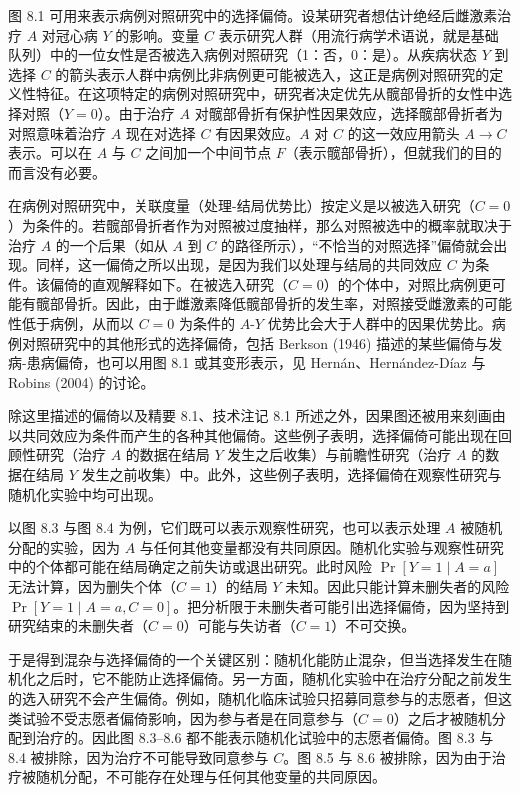 \begin{finepoint}[病例对照研究中的选择偏倚]
图 8.1 可用来表示病例对照研究中的选择偏倚。设某研究者想估计绝经后雌激素治疗 $A$ 对冠心病 $Y$ 的影响。变量 $C$ 表示研究人群（用流行病学术语说，就是基础队列）中的一位女性是否被选入病例对照研究（1：否，0：是）。从疾病状态 $Y$ 到选择 $C$ 的箭头表示人群中病例比非病例更可能被选入，这正是病例对照研究的定义性特征。在这项特定的病例对照研究中，研究者决定优先从髋部骨折的女性中选择对照（$Y=0$）。由于治疗 $A$ 对髋部骨折有保护性因果效应，选择髋部骨折者为对照意味着治疗 $A$ 现在对选择 $C$ 有因果效应。$A$ 对 $C$ 的这一效应用箭头 $A\to C$ 表示。可以在 $A$ 与 $C$ 之间加一个中间节点 $F$（表示髋部骨折），但就我们的目的而言没有必要。

在病例对照研究中，关联度量（处理-结局优势比）按定义是以被选入研究（$C=0$）为条件的。若髋部骨折者作为对照被过度抽样，那么对照被选中的概率就取决于治疗 $A$ 的一个后果（如从 $A$ 到 $C$ 的路径所示），“不恰当的对照选择”偏倚就会出现。同样，这一偏倚之所以出现，是因为我们以处理与结局的共同效应 $C$ 为条件。该偏倚的直观解释如下。在被选入研究（$C=0$）的个体中，对照比病例更可能有髋部骨折。因此，由于雌激素降低髋部骨折的发生率，对照接受雌激素的可能性低于病例，从而以 $C=0$ 为条件的 $A$-$Y$ 优势比会大于人群中的因果优势比。病例对照研究中的其他形式的选择偏倚，包括 Berkson (1946) 描述的某些偏倚与发病-患病偏倚，也可以用图 8.1 或其变形表示，见 Hernán、Hernández-Díaz 与 Robins (2004) 的讨论。
\end{finepoint}

除这里描述的偏倚以及精要 8.1、技术注记 8.1 所述之外，因果图还被用来刻画由以共同效应为条件而产生的各种其他偏倚。这些例子表明，选择偏倚可能出现在回顾性研究（治疗 $A$ 的数据在结局 $Y$ 发生之后收集）与前瞻性研究（治疗 $A$ 的数据在结局 $Y$ 发生之前收集）中。此外，这些例子表明，选择偏倚在观察性研究与随机化实验中均可出现。

以图 8.3 与图 8.4 为例，它们既可以表示观察性研究，也可以表示处理 $A$ 被随机分配的实验，因为 $A$ 与任何其他变量都没有共同原因。随机化实验与观察性研究中的个体都可能在结局确定之前失访或退出研究。此时风险 $\Pr[Y=1\mid A=a]$ 无法计算，因为删失个体（$C=1$）的结局 $Y$ 未知。因此只能计算未删失者的风险 $\Pr[Y=1\mid A=a,C=0]$。把分析限于未删失者可能引出选择偏倚，因为坚持到研究结束的未删失者（$C=0$）可能与失访者（$C=1$）不可交换。

于是得到混杂与选择偏倚的一个关键区别：随机化能防止混杂，但当选择发生在随机化之后时，它不能防止选择偏倚。另一方面，随机化实验中在治疗分配之前发生的选入研究不会产生偏倚。例如，随机化临床试验只招募同意参与的志愿者，但这类试验不受志愿者偏倚影响，因为参与者是在同意参与（$C=0$）之后才被随机分配到治疗的。因此图 8.3–8.6 都不能表示随机化试验中的志愿者偏倚。图 8.3 与 8.4 被排除，因为治疗不可能导致同意参与 $C$。图 8.5 与 8.6 被排除，因为由于治疗被随机分配，不可能存在处理与任何其他变量的共同原因。

